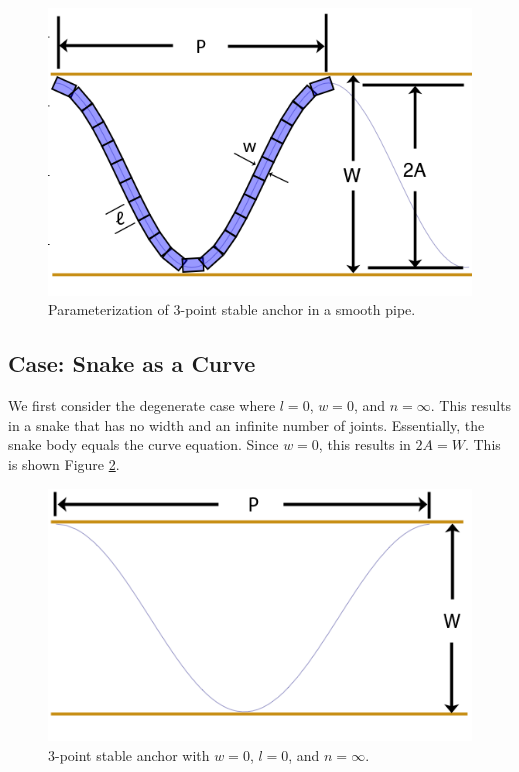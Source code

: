 \begin{figure}[htb]
\begin{center}
\includegraphics[scale=0.5]{CurveDiagram}
\end{center}
\caption{Parameterization of 3-point stable anchor in a smooth pipe.}
\label{param_1}
\end{figure}

\subsection{Case: Snake as a Curve}

We first consider the degenerate case where $l = 0$, $w = 0$, and $n = \infty $.  This results in a snake that has no width and an infinite number of joints.  Essentially, the snake body equals the curve equation.  Since $w = 0$, this results in $ 2A = W $.  This is shown Figure \ref{deg_1}.

\begin{figure}[htb]
\begin{center}
\includegraphics[scale=0.5]{DegenerateCurve}
\end{center}
\caption{3-point stable anchor with $w = 0$, $l = 0$, and $n = \infty $.}
\label{deg_1}
\end{figure}

